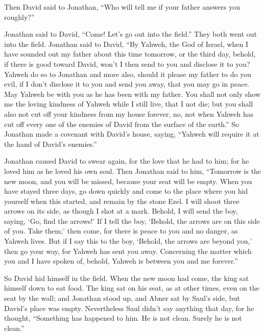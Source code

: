  Then David said to Jonathan, ``Who will tell me if your
father answers you roughly?''

 Jonathan said to David, ``Come! Let's go out into the
field.'' They both went out into the field.  Jonathan
said to David, ``By Yahweh, the God of Israel, when I have sounded out
my father about this time tomorrow, or the third day, behold, if there
is good toward David, won't I then send to you and disclose it to you?
 Yahweh do so to Jonathan and more also, should it please
my father to do you evil, if I don't disclose it to you and send you
away, that you may go in peace. May Yahweh be with you as he has been
with my father.  You shall not only show me the loving
kindness of Yahweh while I still live, that I not die; 
but you shall also not cut off your kindness from my house forever, no,
not when Yahweh has cut off every one of the enemies of David from the
surface of the earth.''  So Jonathan made a covenant with
David's house, saying, ``Yahweh will require it at the hand of David's
enemies.''

 Jonathan caused David to swear again, for the love that
he had to him; for he loved him as he loved his own soul.
 Then Jonathan said to him, ``Tomorrow is the new moon,
and you will be missed, because your seat will be empty. 
When you have stayed three days, go down quickly and come to the place
where you hid yourself when this started, and remain by the stone Ezel.
 I will shoot three arrows on its side, as though I shot
at a mark.  Behold, I will send the boy, saying, `Go,
find the arrows!' If I tell the boy, `Behold, the arrows are on this
side of you. Take them;' then come, for there is peace to you and no
danger, as Yahweh lives.  But if I say this to the boy,
`Behold, the arrows are beyond you,' then go your way, for Yahweh has
sent you away.  Concerning the matter which you and I
have spoken of, behold, Yahweh is between you and me forever.''

 So David hid himself in the field. When the new moon had
come, the king sat himself down to eat food.  The king
sat on his seat, as at other times, even on the seat by the wall; and
Jonathan stood up, and Abner sat by Saul's side, but David's place was
empty.  Nevertheless Saul didn't say anything that day,
for he thought, ``Something has happened to him. He is not clean. Surely
he is not clean.''

